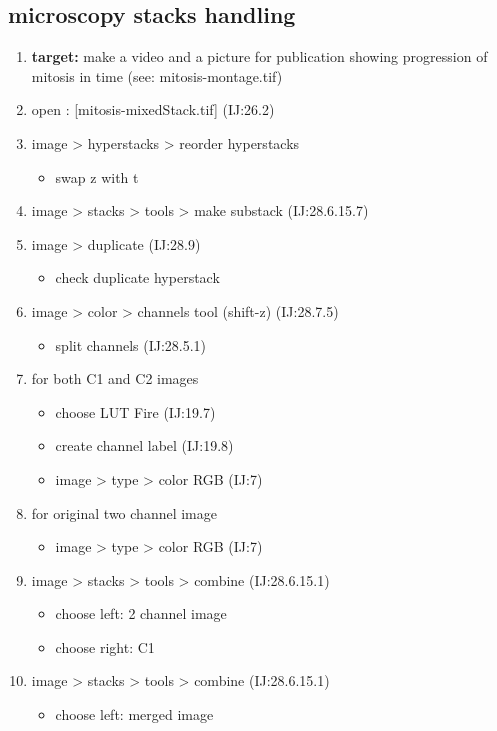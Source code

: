 \documentclass[11pt]{article}
\begin{document}
\subsection{microscopy stacks handling}
\label{sec-2-4}
\begin{enumerate}
\item \textbf{target:} make a video and a picture for publication showing progression of mitosis in time (see: mitosis-montage.tif)
\item open : [mitosis-mixedStack.tif] (IJ:26.2)
\item image > hyperstacks > reorder hyperstacks
\begin{itemize}
\item swap z with t
\end{itemize}
\item image > stacks > tools > make substack (IJ:28.6.15.7)
\item image > duplicate (IJ:28.9)
\begin{itemize}
\item check duplicate hyperstack
\end{itemize}
\item image > color > channels tool (shift-z) (IJ:28.7.5)
\begin{itemize}
\item split channels (IJ:28.5.1)
\end{itemize}
\item for both C1 and C2 images
\begin{itemize}
\item choose LUT Fire (IJ:19.7)
\item create channel label (IJ:19.8)
\item image > type > color RGB (IJ:7)
\end{itemize}
\item for original two channel image
\begin{itemize}
\item image > type > color RGB (IJ:7)
\end{itemize}
\item image > stacks > tools > combine (IJ:28.6.15.1)
\begin{itemize}
\item choose left: 2 channel image
\item choose right: C1
\end{itemize}
\item image > stacks > tools > combine (IJ:28.6.15.1)
\begin{itemize}
\item choose left: merged image

\end{itemize}
\end{enumerate}
\end{document}
